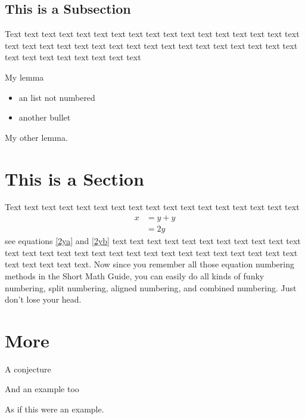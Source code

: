 \subsection{This is a Subsection}
Text text text text text text text text text text text text text text
text text text text text text text text text text text text text text
text text text text text text text text text text text text text text

\begin{lem}
 My lemma
\end{lem}

\begin{itemize}
 \item{an list not numbered}
 \item{another bullet}
\end{itemize}

\begin{lem}
My other lemma.
\end{lem}

\section{This is a Section}
Text text text text text text text text text text text text text text
text text text
\begin{align} %
\label{2ya}
x & = y + y\\
\label{2yb}
& = 2y
\end{align}
see equations \ref{2ya} and \ref{2yb}
text text text text text text text text text text text text text text
text text text text text text text text text text text text text text
text text text text text. Now since you remember all those equation 
numbering methods in the Short Math Guide, you can easily do all kinds
of funky numbering, split numbering, aligned numbering, and combined
numbering. Just don't lose your head.

\section{More}

\begin{conj}
 A conjecture
\end{conj}

And an example too

\begin{exa}
 As if this were an example.
\end{exa}



